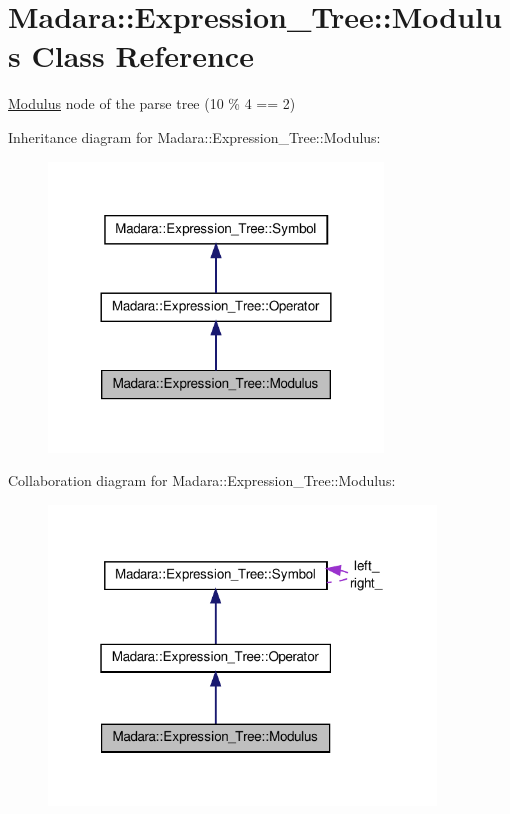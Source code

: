 \hypertarget{classMadara_1_1Expression__Tree_1_1Modulus}{
\section{Madara::Expression\_\-Tree::Modulus Class Reference}
\label{d5/d49/classMadara_1_1Expression__Tree_1_1Modulus}
}


\hyperlink{classMadara_1_1Expression__Tree_1_1Modulus}{Modulus} node of the parse tree (10 \% 4 == 2)  




Inheritance diagram for Madara::Expression\_\-Tree::Modulus:
\nopagebreak
\begin{figure}[H]
\begin{center}
\leavevmode
\includegraphics[width=252pt]{db/dc5/classMadara_1_1Expression__Tree_1_1Modulus__inherit__graph}
\end{center}
\end{figure}


Collaboration diagram for Madara::Expression\_\-Tree::Modulus:
\nopagebreak
\begin{figure}[H]
\begin{center}
\leavevmode
\includegraphics[width=292pt]{d8/dbb/classMadara_1_1Expression__Tree_1_1Modulus__coll__graph}
\end{center}
\end{figure}
